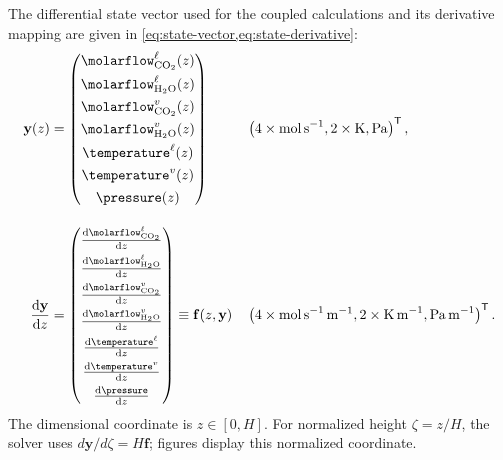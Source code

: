 The differential state vector used for the coupled calculations and its derivative mapping are given in \cref{eq:state-vector,eq:state-derivative}:
\begin{align}
\mathbf{y}(z) &=
\begin{pmatrix}
\molarflow^{\liq}_{\COtwo}(z)\\[4pt]
\molarflow^{\liq}_{\HtwoO}(z)\\[4pt]
\molarflow^{\vap}_{\COtwo}(z)\\[4pt]
\molarflow^{\vap}_{\HtwoO}(z)\\[4pt]
\temperature^{\liq}(z)\\[4pt]
\temperature^{\vap}(z)\\[4pt]
\pressure(z)
\end{pmatrix}
&& \left(
4\times\unit{mol\,s^{-1}},
2\times\unit{K},
\unit{Pa}
\right)^{\mathsf{T}}\label{eq:state-vector},\\[1em]
\odv{\mathbf{y}}{z} &=
\begin{pmatrix}
\odv{\molarflow^{\liq}_{ \COtwo}}{z} \\[4pt]
\odv{\molarflow^{\liq}_{ \HtwoO}}{z} \\[4pt]
\odv{\molarflow^{\vap}_{ \COtwo}}{z} \\[4pt]
\odv{\molarflow^{\vap}_{ \HtwoO}}{z} \\[4pt]
\odv{\temperature^{\liq}}{z} \\[4pt]
\odv{\temperature^{\vap}}{z}\\[4pt]
\odv{\pressure}{z}
\end{pmatrix}
\equiv
\mathbf{f}(z, \mathbf{y})
&& \left(
4\times\unit{mol\,s^{-1}\,m^{-1}},
2\times\unit{K\,m^{-1}},
\unit{Pa\,m^{-1}}
\right)^{\mathsf{T}}.\label{eq:state-derivative}
\end{align}
The dimensional coordinate is $z\in[0,H]$.
For normalized height $\zeta=z/H$, the solver uses $d\mathbf y/d\zeta=H\mathbf f$; figures display this normalized coordinate.

